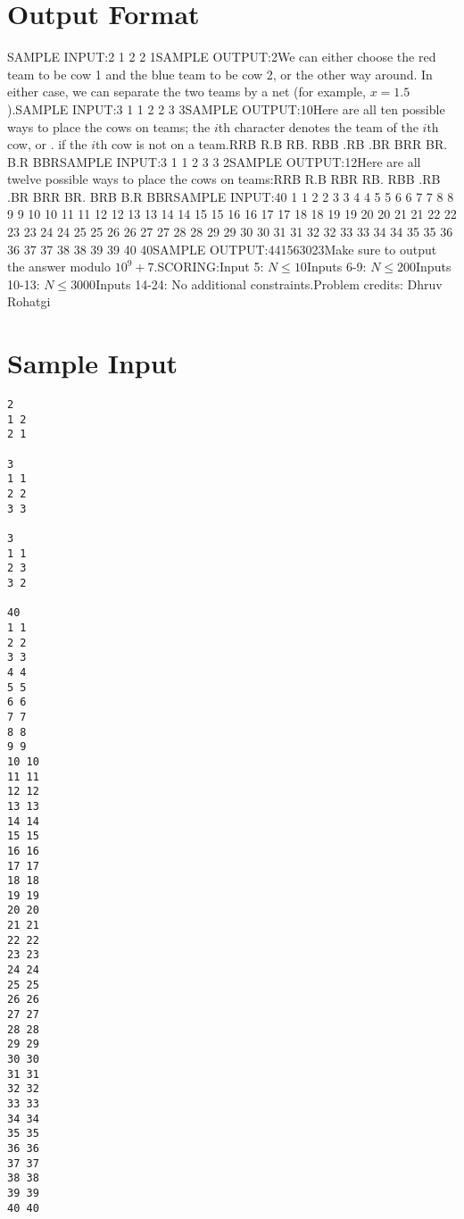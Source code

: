 \documentclass[12pt]{article}
\begin{document}
\section*{Output Format}
SAMPLE INPUT:2
1 2
2 1SAMPLE OUTPUT:2We can either choose the red team to be cow 1 and the blue team to be cow 2, or
the other way around. In either case, we can separate the two teams by a net
(for example, $x=1.5$).SAMPLE INPUT:3
1 1
2 2
3 3SAMPLE OUTPUT:10Here are all ten possible ways to place the cows on teams; the $i$th character
denotes the team of the $i$th cow, or . if the $i$th cow is not on a team.RRB
R.B
RB.
RBB
.RB
.BR
BRR
BR.
B.R
BBRSAMPLE INPUT:3
1 1
2 3
3 2SAMPLE OUTPUT:12Here are all twelve possible ways to place the cows on teams:RRB
R.B
RBR
RB.
RBB
.RB
.BR
BRR
BR.
BRB
B.R
BBRSAMPLE INPUT:40
1 1
2 2
3 3
4 4
5 5
6 6
7 7
8 8
9 9
10 10
11 11
12 12
13 13
14 14
15 15
16 16
17 17
18 18
19 19
20 20
21 21
22 22
23 23
24 24
25 25
26 26
27 27
28 28
29 29
30 30
31 31
32 32
33 33
34 34
35 35
36 36
37 37
38 38
39 39
40 40SAMPLE OUTPUT:441563023Make sure to output the answer modulo $10^9+7$.SCORING:Input 5: $N\le 10$Inputs 6-9: $N\le 200$Inputs 10-13: $N\le 3000$Inputs 14-24: No additional constraints.Problem credits: Dhruv Rohatgi

\section*{Sample Input}
\begin{verbatim}
2
1 2
2 1

3
1 1
2 2
3 3

3
1 1
2 3
3 2

40
1 1
2 2
3 3
4 4
5 5
6 6
7 7
8 8
9 9
10 10
11 11
12 12
13 13
14 14
15 15
16 16
17 17
18 18
19 19
20 20
21 21
22 22
23 23
24 24
25 25
26 26
27 27
28 28
29 29
30 30
31 31
32 32
33 33
34 34
35 35
36 36
37 37
38 38
39 39
40 40
\end{verbatim}
\end{document}
